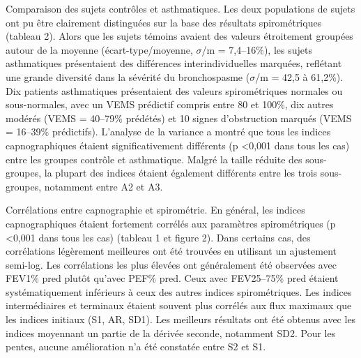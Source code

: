 \documentclass[12pt,]{article}
\begin{document}
Comparaison des sujets contrôles et asthmatiques. Les deux populations
de sujets ont pu être clairement distinguées sur la base des résultats
spirométriques (tableau 2). Alors que les sujets témoins avaient des
valeurs étroitement groupées autour de la moyenne (écart-type/moyenne,
\(\sigma\)/m = 7,4--16\%), les sujets asthmatiques présentaient des
différences interindividuelles marquées, reflétant une grande diversité
dans la sévérité du bronchospasme (\(\sigma\)/m = 42,5 à 61,2\%). Dix
patients asthmatiques présentaient des valeurs spirométriques normales
ou sous-normales, avec un VEMS prédictif compris entre 80 et 100\%, dix
autres modérés (VEMS = 40--79\% prédétés) et 10 signes d'obstruction
marqués (VEMS = 16--39\% prédictifs). L'analyse de la variance a montré
que tous les indices capnographiques étaient significativement
différents (p \textless{}0,001 dans tous les cas) entre les groupes
contrôle et asthmatique. Malgré la taille réduite des sous-groupes, la
plupart des indices étaient également différents entre les trois
sous-groupes, notamment entre A2 et A3.

Corrélations entre capnographie et spirométrie. En général, les indices
capnographiques étaient fortement corrélés aux paramètres spirométriques
(p \textless{}0,001 dans tous les cas) (tableau 1 et figure 2). Dans
certains cas, des corrélations légèrement meilleures ont été trouvées en
utilisant un ajustement semi-log. Les corrélations les plus élevées ont
généralement été observées avec FEV1\% pred plutôt qu'avec PEF\% pred.
Ceux avec FEV25--75\% pred étaient systématiquement inférieurs à ceux
des autres indices spirométriques. Les indices intermédiaires et
terminaux étaient souvent plus corrélés aux flux maximaux que les
indices initiaux (S1, AR, SD1). Les meilleurs résultats ont été obtenus
avec les indices moyennant un partie de la dérivée seconde, notamment
SD2. Pour les pentes, aucune amélioration n'a été constatée entre S2 et
S1.
\end{document}
